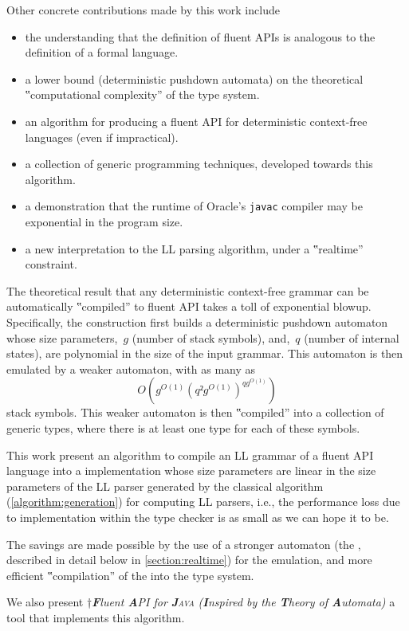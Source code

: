 Other concrete contributions made by this work include
\begin{itemize}
  \item the understanding that the definition of fluent APIs is analogous to
      the definition of a formal language.
  \item a lower bound (deterministic pushdown automata)
    on the theoretical ‟computational complexity” of the \Java type system.
  \item an algorithm for producing a fluent API for deterministic context-free languages (even if impractical).
  \item a collection of generic programming techniques, developed towards this algorithm.
  \item a demonstration that the runtime of Oracle's \texttt{javac} compiler may be exponential in the program size.
  \item a new interpretation to the LL parsing algorithm, under a ‟realtime” constraint.
\end{itemize}

The theoretical result that any deterministic context-free grammar can be
automatically ‟compiled” to fluent API takes a toll of exponential blowup.
Specifically, the construction first builds a deterministic pushdown automaton
whose size parameters,~$g$ (number of stack symbols), and,~$q$ (number of
internal states), are polynomial in the size of the input grammar. This
automaton is then emulated by a weaker automaton, with as many as
\[
  O\left(g^{O(1)}\left(q²g^{O(1)}\right)^{qg^{O(1)}}\right)
\]
stack symbols.
This weaker automaton is then ‟compiled” into a collection of generic \Java types,
where there is at least one type for each of these symbols.

This work present an algorithm to compile an LL grammar of a fluent API
language into a \Java implementation whose size parameters are linear in
the size parameters of the LL parser generated by the classical
algorithm (\cref{algorithm:generation}) for computing LL parsers,
i.e., the performance loss due to implementation within the \Java
type checker is as small as we can hope it to be.

The savings are made possible by the use of a stronger automaton (the \RLLp,
described in detail below in \cref{section:realtime}) for the emulation, and
more efficient ‟compilation” of the \RLLp into the \Java type system.

We also present \Fajita
†{\itshape \textbf Fluent \textbf API for \textsc{\textbf Java}
  (\textbf Inspired by the \textbf Theory of \textbf Automata)
}
a \Java tool that implements this algorithm.

